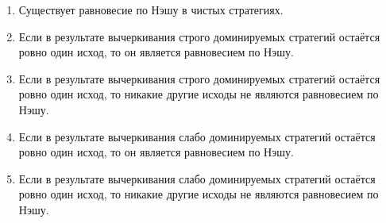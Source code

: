 \begin{enumerate}[label=$\square$]
	
	
	
	\item Существует равновесие по Нэшу в чистых стратегиях.
	\item Если в результате вычеркивания строго доминируемых стратегий остаётся ровно один исход, то он является равновесием по Нэшу.
	\item Если в результате вычеркивания строго доминируемых стратегий остаётся ровно один исход, то никакие другие исходы не являются равновесием по Нэшу.
	\item Если в результате вычеркивания слабо доминируемых стратегий остаётся ровно один исход, то он является равновесием по Нэшу.
	\item Если в результате вычеркивания слабо доминируемых стратегий остаётся ровно один исход, то никакие другие исходы не являются равновесием по Нэшу.
	
\end{enumerate}

